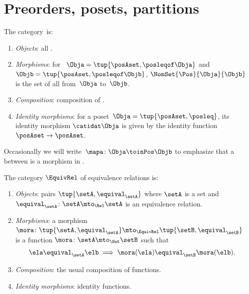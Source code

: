 
\section[Preorders, posets]{Preorders, posets, partitions}
\label{sec:category-Pos}

\begin{ctdefinition}
    \label{def:Pos}
    The category~\Pos is:
    \begin{enumerate}
        \item \emph{Objects}: all .
        \item \emph{Morphisms}: for ~$\Obja = \tup{\posAset, {{\posleqof\Obja}}}$ and $\Objb = \tup{\posAset, {{\posleqof\Objb}}}$,  $\HomSet{\Pos}{\Obja}{\Objb}$ is the set of all  from~$\Obja$ to~$\Objb$.
        \item \emph{Composition}: composition of .
        \item \emph{Identity morphisms}: for a poset~$\Obja = \tup{\posAset, {{\posleq}}}$, its identity morphism $\catidat\Obja$ is given by the identity function $\posAset \to \posAset$.
    \end{enumerate}
\end{ctdefinition}

Occasionally we will write~$\mapa \colon \Obja \toinPos \Objb$ to emphasize that a  between  is a morphism in \Pos.



\begin{ctdefinition}
    \label{def:cat-equivalence-relations}
    The category $\EquivRel$ of equivalence relations is:
    \begin{enumerate}
        \item \emph{Objects}: pairs $\tup{\setA, \equival_{\setA}}$ where $\setA$ is a set and $\equival_{\setA} \colon \setA \mto_{\Rel} \setA$ is an equivalence relation.
        \item \emph{Morphisms}: a morphism $\mora \colon \tup{\setA, \equival_{\setA}} \mto_{\EquivRel} \tup{\setB, \equival_{\setB}}$ is a function $\mora \colon \setA \mto_{\Set} \setB$ such that
              \begin{equation}\label{eq:morphism-of-equiv-rel}
                  \ela \equival_\setA \elb \implies \mora(\ela) \equival_\setB \mora(\elb).
              \end{equation}
        \item \emph{Composition}: the usual composition of functions.
        \item \emph{Identity morphisms}: identity functions.
    \end{enumerate}
\end{ctdefinition}

